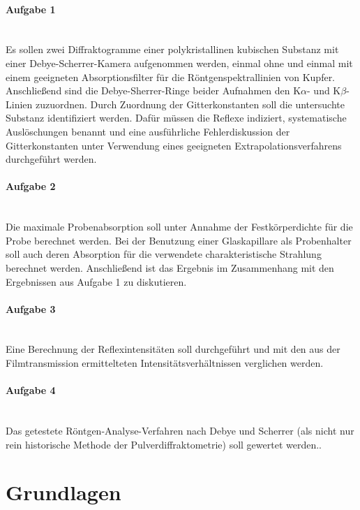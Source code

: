 \documentclass[a4paper,twoside,final]{article}
\begin{document}
\paragraph{Aufgabe 1}$~$\\
 Es sollen zwei Diffraktogramme einer polykristallinen kubischen Substanz mit einer Debye\--Scherrer\--Ka\-me\-ra aufgenommen werden, einmal ohne und einmal mit einem geeigneten Absorptionsfilter für die Röntgenspektrallinien von Kupfer. Anschließend sind die Debye-Sherrer-Ringe beider Aufnahmen den K$\alpha$- und K$\beta$- Linien zuzuordnen. Durch Zuordnung der Gitterkonstanten soll die untersuchte Substanz identifiziert werden. Dafür müssen die Reflexe indiziert, systematische Auslöschungen benannt und eine ausführliche Fehlerdiskussion der Gitterkonstanten unter Verwendung eines geeigneten Extrapolationsverfahrens durchgeführt werden.
\paragraph{Aufgabe 2}$~$\\
Die maximale Probenabsorption soll unter Annahme der Festkörperdichte für die Probe berechnet werden. Bei der Benutzung einer Glaskapillare als Probenhalter soll auch deren Absorption für die verwendete charakteristische Strahlung berechnet werden. Anschließend ist das Ergebnis im Zusammenhang mit den Ergebnissen aus Aufgabe 1 zu diskutieren.
\paragraph{Aufgabe 3}$~$\\
Eine Berechnung der Reflexintensitäten soll durchgeführt und mit den aus der Filmtransmission ermittelteten Intensitätsverhältnissen verglichen werden.
\paragraph{Aufgabe 4}$~$\\
Das getestete Röntgen-Analyse-Verfahren nach Debye und Scherrer (als nicht nur rein \glqq historische\grqq{} Methode der Pulverdiffraktometrie) soll gewertet werden..


\section{Grundlagen} \label{sec:Grundlagen}
\end{document}
